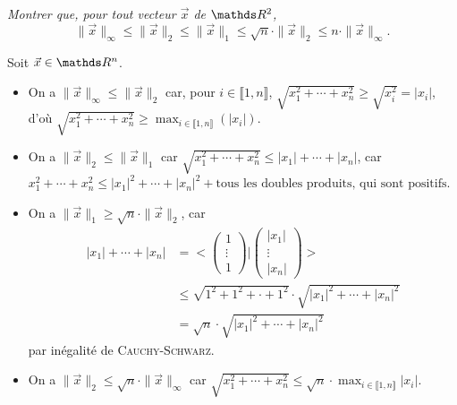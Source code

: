 \begin{exo}
	\textsl{Montrer que, pour tout vecteur $\vec{x}$\/ de $\R^2$, \[
		\|\vec{x}\|_\infty \le \|\vec{x}\|_2 \le \|\vec{x}\|_1 \le \sqrt{n} \cdot \|\vec{x}\|_2 \le n \cdot \|\vec{x}\|_\infty
	.\]}

	Soit $\vec{x} \in \R^n$.

	\begin{itemize}
		\item On a $\|\vec{x}\|_\infty \le \|\vec{x}\|_2$\/ car, pour $i \in \llbracket 1,n \rrbracket$, $\sqrt{x_1^2 + \cdots + x_n^2} \ge \sqrt{x_i^2} = |x_i|$, d'où $\sqrt{x_1^2 + \cdots + x_n^2} \ge \max_{i \in \llbracket 1,n \rrbracket}(|x_i|)$.
		\item On a $\|\vec{x}\|_2 \le \|\vec{x}\|_1$\/ car $\sqrt{x_1^2 + \cdots + x_n^2} \le |x_1| + \cdots + |x_n|$, car $x_1^2 + \cdots + x_n^2 \le |x_1|^2 + \cdots + |x_n|^2 + \text{tous les doubles produits, qui sont positifs}$.
		\item On a $\|\vec{x}\|_1 \ge \sqrt{n}\cdot \|\vec{x}\|_2$, car
			\begin{align*}
				|x_1| + \cdots + |x_n| &= \Bigg< \begin{pmatrix}
					1\\ \vdots\\ 1
				\end{pmatrix} \Bigg| \begin{pmatrix}
					|x_1|\\ \vdots\\ |x_n|
				\end{pmatrix} \Bigg> \\ &\le \sqrt{1^2 + 1^2 + \cdot + 1^2} \cdot \sqrt{|x_1|^2 + \cdots + |x_n|^2}\\
				&= \sqrt{n} \cdot \sqrt{|x_1|^2 + \cdots + |x_n|^2} 
			\end{align*}
			par inégalité de \textsc{Cauchy-Schwarz}.
		\item On a $\|\vec{x}\|_2 \le \sqrt{n} \cdot \|\vec{x}\|_\infty$\/ car $\sqrt{x_1^2 + \cdots + x_n^2} \le \sqrt{n} \cdot \max_{i \in \llbracket 1,n \rrbracket} |x_i|$.
	\end{itemize}
\end{exo}

